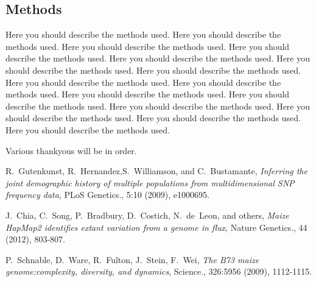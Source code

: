 \documentclass{pnastwo}
\begin{document}
\begin{article}
\begin{materials}
\subsection{Methods}
Here you should describe the methods used. Here you should describe the methods used. Here you should describe the methods used. Here you should describe the methods used. Here you should describe the methods used. Here you should describe the methods used. Here you should describe the methods used. Here you should describe the methods used. Here you should describe the methods used. Here you should describe the methods used. Here you should describe the methods used. Here you should describe the methods used. Here you should describe the methods used. Here you should describe the methods used. Here you should describe the methods used. 
\end{materials}

\begin{acknowledgments}
Various thankyous will be in order.
\end{acknowledgments}


\begin{thebibliography}{10}
R.~Gutenkunst, R.~Hernandez,S.~Williamson, and C.~Bustamante, {\em
  Inferring the joint demographic history of multiple populations from
  multidimensional SNP frequency data}, PLoS Genetics., 5:10 (2009), e1000695.

J.~Chia, C.~Song, P.~Bradbury, D.~Costich, N.~de~Leon, and others,
\emph{Maize HapMap2 identifies extant variation from a genome in
  flux}, Nature Genetics., 44 (2012), 803-807.

P.~Schnable, D.~Ware, R.~Fulton, J.~Stein, F.~Wei, \emph{The B73 maize
genome:complexity, diversity, and dynamics}, Science., 326:5956
(2009), 1112-1115.

\end{thebibliography}
\end{article}
\end{document}
